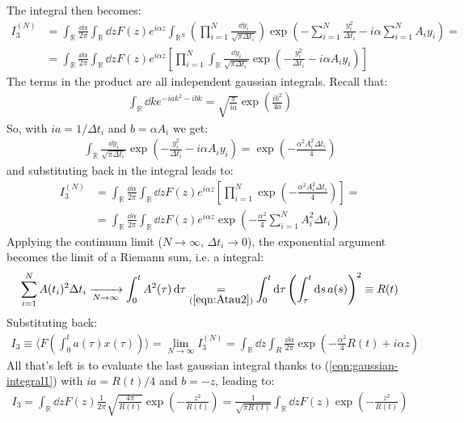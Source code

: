 \documentclass[../template.tex]{subfiles}
\begin{document}
The integral then becomes:
\begin{align*}
    I_3^{(N)} &= 
    \int_{\mathbb{R}} \frac{\dd{\alpha}}{2 \pi} \int_{\mathbb{R}} \dd{z} F(z) e^{i \alpha z} \int_{\mathbb{R}^N} \left( \prod_{i=1}^N \frac{\dd{y_i}}{\sqrt{\pi \Delta t_i}}\right) \exp\left(-\sum_{i=1}^N \frac{y_i^2}{\Delta t_i} - i \alpha \sum_{i=1}^N A_i y_i \right) =\\
    &= \int_{\mathbb{R}} \frac{\dd{\alpha}}{2 \pi} \int_{\mathbb{R}} \dd{z} F(z) e^{i \alpha z} \left[\prod_{i=1}^N  \int_{\mathbb{R}} \frac{\dd{y_i}}{\sqrt{\pi \Delta t_i}} \exp\left(-\frac{y_i^2}{ \Delta t_i} - i \alpha A_i y_i \right) \right]   
\end{align*}
The terms in the product are all independent gaussian integrals. Recall that:
\begin{align}
    \int_{\mathbb{R}} \dd{k} e^{-ia k^2 - ibk} = \sqrt{\frac{\pi}{ia} } \exp\left(\frac{ib^2}{4 a} \right)
    \label{eqn:gaussian-integral1}
\end{align}
So, with $ia = 1/\Delta t_i$ and $b = \alpha A_i$ we get:
\begin{align*}
    \int_{\mathbb{R}} \frac{\dd{y_i}}{\sqrt{\pi \Delta t_i}} \exp\left(-\frac{y_i^2}{\Delta t_i} - i \alpha A_i y_i \right)  = \exp\left(-\frac{\alpha^2 A_i^2 \Delta t_i}{4} \right)
\end{align*}  
and substituting back in the integral leads to:
\begin{align*}
    I_3^{(N)} &= \int_{\mathbb{R}} \frac{\dd{\alpha}}{2 \pi} \int_{\mathbb{R}} \dd{z} F(z)  e^{i \alpha z} \left[ \prod_{i=1}^N \exp\left(-\frac{\alpha^2 A_i^2 \Delta t_i}{4} \right) \right] =\\
    &= \int_{\mathbb{R}} \frac{\dd{\alpha}}{2 \pi} \int_{\mathbb{R}} \dd{z} F(z) e^{i \alpha z} \exp\left(-\frac{\alpha^2}{4} \sum_{i=1}^N A_i^2 \Delta t_i \right)
\end{align*}
Applying the continuum limit ($N \to\infty$, $\Delta t_i \to 0$), the exponential argument becomes the limit of a Riemann sum, i.e. a integral:
\begin{align*}
    \sum_{i=1}^N A(t_i)^2 \Delta t_i  \xrightarrow[N \to \infty]{}  \int_0^t A^2(\tau) \dd{\tau} \underset{(\ref{eqn:Atau2})}{=}  \int_0^t \dd{\tau} \left(\int_{\tau}^t \dd{s} a(s)\right)^2 \equiv R(t)
\end{align*}
Substituting back:
\begin{align*}
    I_3 \equiv
    \langle F\left(\int_{0}^t a(\tau )x(\tau)\right) \rangle = \lim_{N \to\infty } I_3^{(N)} = \int_{\mathbb{R}} \dd{z} \int_{R} \frac{\dd{\alpha}}{2 \pi} \exp\left(-\frac{\alpha^2}{4} R(t) + i \alpha z \right) 
\end{align*}
All that's left is to evaluate the last gaussian integral thanks to (\ref{eqn:gaussian-integral1}) with $ia = R(t)/4$ and $b = -z$, leading to:
\begin{align*}
    I_3 = \int_{\mathbb{R}} \dd{z} F(z) \frac{1}{2 \pi} \sqrt{\frac{4 \pi}{R(t)} } \exp\left(-\frac{z^2}{R(t)} \right) = \frac{1}{\sqrt{\pi R(t)}} \int_{\mathbb{R}} \dd{z} F(z) \exp\left(-\frac{z^2}{R(t)} \right)  
\end{align*}
\end{document}
